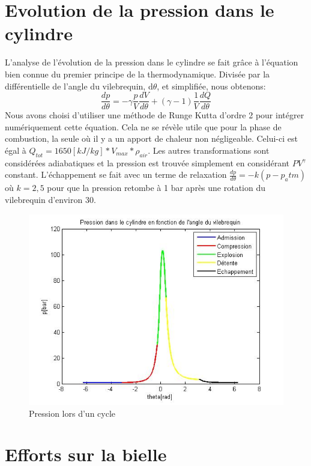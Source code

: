 \documentclass[a4paper,oneside,12pt]{report}
\begin{document}
\section{Evolution de la pression dans le cylindre}

L'analyse de l'évolution de la pression dans le cylindre se fait grâce à l'équation bien connue du premier principe de la thermodynamique. Divisée par la différentielle de l'angle du vilebrequin, d$\theta$, et simplifiée, nous obtenons:
$$\frac{dp}{d\theta}=-\gamma\frac{p}{V}\frac{dV}{d\theta}+(\gamma - 1) \frac{1}{V}\frac{dQ}{d\theta}$$
Nous avons choisi d'utiliser une méthode de Runge Kutta d'ordre 2 pour intégrer numériquement cette équation. Cela ne se révèle utile que pour la phase de combustion, la seule où il y a un apport de chaleur non négligeable. Celui-ci est égal à $Q_{tot}=1650[kJ/kg] * V_{max} * \rho_{air}$. Les autres transformations sont considérées adiabatiques et la pression est trouvée simplement en considérant $PV^{\gamma}$ constant. L'échappement se fait avec un terme de relaxation $\frac{dp}{d\theta}=-k(p-p_atm)$ où $k=2,5$ pour que la pression retombe à 1 bar après une rotation du vilebrequin d'environ 30\degre.

\begin{figure}[H]
	\center
	\includegraphics[scale=0.6]{pression.jpg}
	\caption{Pression lors d'un cycle}
\end{figure}

\section{Efforts sur la bielle}
\end{document}
